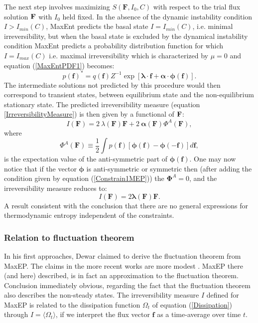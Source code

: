 \documentclass[a4paper,12pt]{article}
\begin{document}
The next step involves maximizing $S(\bm{F}, I_0, C)$ with respect to the trial flux solution $\bf{F}$ with $I_0$ held fixed.
In the absence of the dynamic instability condition $I>I_{min}(C)$, MaxEnt predicts the basal state $I=I_{min}(C)$, i.e. minimal irreversibility, but when the basal state is excluded by the dynamical instability condition MaxEnt predicts a probability distribution function for which $I=I_{max}(C)$ i.e. maximal irreversibility which is characterized by $\mu =0$ and equation (\ref{MaxEntPDF1}) becomes:
\begin{equation}
\label{MaxEntPDF2}
  p(\bm{f})^* = q( \bm{f} ) Z^{-1} \exp[\bm{\lambda} \cdot \bm{f}+ \bm{\alpha} \cdot \bm{\phi} (\bm{f})].
\end{equation}
The intermediate solutions not predicted by this procedure would then correspond to transient states, between equilibrium state and the non-equilibrium stationary state.
The predicted irreversibility measure (equation \ref{IrreversibilityMeasure}) is then given by a functional of $\bf{F}$:
\begin{equation}
  I(\bm{F}) =2\ \lambda(\bm{F}) \bm{F} + 2\ \bm{\alpha(\bm{F})} \Phi^A(\bm{F}),
\end{equation}
where 
\begin{equation}
  \Phi^A(\bm{F}) \equiv \frac{1}{2} \int p(\bm{f})[\bm{\phi}(\bm{f})-\bm{\phi}(\bm{-f})]d\bm{f},
\end{equation}
is the expectation value of the anti-symmetric part of $\bm{\phi}(\bm{f})$. One may now notice that if the vector $\bm{\phi}$ is anti-symmetric or symmetric then (after adding the condition given by equation (\ref{Constrain1MEP})) the $\bm{\Phi}^A =0$, and the irreversibility measure reduces to:
\begin{equation}
\label{SymmetricIrreversible}
  I(\bm{F})=2 \bm{\lambda}(\bm{F})\bm{F}.
\end{equation}
A result consistent with the conclusion that there are no general expressions for thermodynamic entropy independent of the constraints.

\subsubsection{Relation to fluctuation theorem}
In his first approaches, Dewar claimed to derive \cite{Dewar:775452, Dewar:2005eo} the fluctuation theorem from MaxEP. The claims in the more recent works are more modest \cite{Dewar:2014ek}. MaxEP there (and here) described, is in fact an approximation to the fluctuation theorem. Conclusion immediately obvious, regarding the fact that the fluctuation theorem also describes the non-steady states.
The irreversibility measure $I$ defined for MaxEP is related to the dissipation function $\Omega_t$ of equation (\ref{Dissipation}) through $I=\langle \Omega_t \rangle$, if we interpret the flux vector $\bm{f}$ as a time-average over time $t$. 
\end{document}
